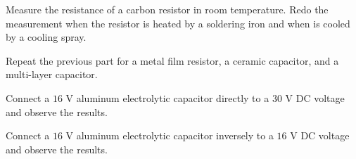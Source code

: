 \documentclass[11pt]{article}
\begin{document}
\begin{question}


\begin{subquestion}{Measure the resistance of a carbon resistor in room temperature. Redo the measurement when the resistor is heated by a soldering iron and when is cooled by a cooling spray. } 
\answer{}
\end{subquestion}

\begin{subquestion}{Repeat the previous part for a metal film resistor, a ceramic capacitor, and a multi-layer capacitor. } 
\answer{}
\end{subquestion}

\end{question}


\begin{question}


\answer{}

\end{question}


\begin{question}


\begin{subquestion}{Connect a $16$ V aluminum electrolytic capacitor directly to a $30$ V DC voltage and observe the results.} 
\answer{}
\end{subquestion}

\begin{subquestion}{Connect a $16$ V aluminum electrolytic capacitor inversely to a $16$ V DC voltage and observe the results.} 
\answer{}
\end{subquestion}

\end{question}
\end{document}
